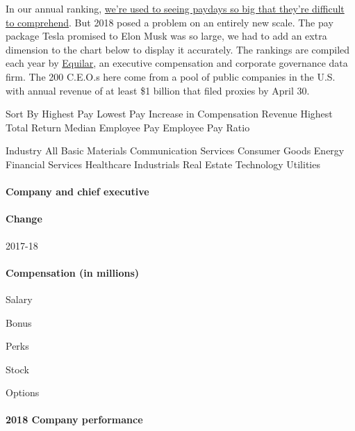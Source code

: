 In our annual ranking,
\href{https://www.nytimes3xbfgragh.onion/2019/05/24/business/highest-paid-ceos-2018.html}{we're
used to seeing paydays so big that they're difficult to comprehend}. But
2018 posed a problem on an entirely new scale. The pay package Tesla
promised to Elon Musk was so large, we had to add an extra dimension to
the chart below to display it accurately. The rankings are compiled each
year by
\href{https://www.equilar.com/reports/table-equilar-200-new-york-times-highest-paid-ceos-2019.html}{Equilar},
an executive compensation and corporate governance data firm. The 200
C.E.O.s here come from a pool of public companies in the U.S. with
annual revenue of at least \$1 billion that filed proxies by April 30.

Sort By Highest Pay Lowest Pay Increase in Compensation Revenue Highest
Total Return Median Employee Pay Employee Pay Ratio

Industry All Basic Materials Communication Services Consumer Goods
Energy Financial Services Healthcare Industrials Real Estate Technology
Utilities

\hypertarget{company-and-chief-executive}{%
\paragraph{Company and chief
executive}\label{company-and-chief-executive}}

\hypertarget{change}{%
\paragraph{Change}\label{change}}

2017-18

\hypertarget{compensation-in-millions}{%
\paragraph{Compensation (in millions)}\label{compensation-in-millions}}

Salary

Bonus

Perks

Stock

Options

\hypertarget{2018-company-performance}{%
\paragraph{2018 Company performance}\label{2018-company-performance}}

